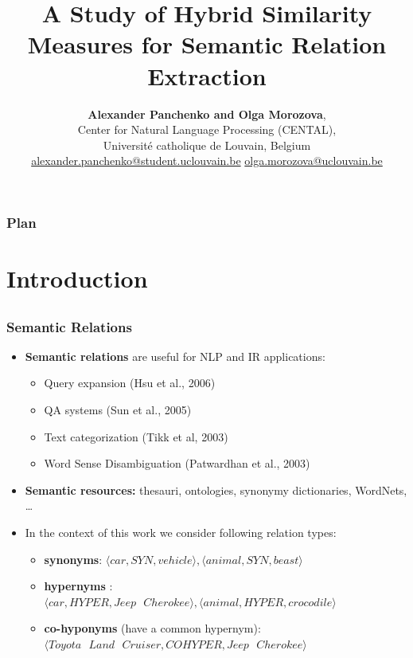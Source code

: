 \documentclass{beamer}
\title[\insertframenumber/\inserttotalframenumber]
{A Study of Hybrid Similarity Measures for Semantic Relation Extraction}
\author[Alexander Panchenko and Olga Morozova]
{\textbf{Alexander Panchenko and Olga Morozova}, \\ Center for Natural Language Processing (CENTAL),\\ Université catholique de Louvain, Belgium \\ {\scriptsize \url{alexander.panchenko@student.uclouvain.be} \url{olga.morozova@uclouvain.be} }}
\begin{document}
\begin{frame}
  \titlepage
\end{frame}

\begin{frame}
  \setcounter{tocdepth}{1}
  \frametitle{Plan}
  \tableofcontents
  \setcounter{tocdepth}{2}
	
\end{frame}

\section{Introduction}
\subsection{}


\begin{frame}
\frametitle{Semantic Relations}


\begin{itemize}
\item \textbf{Semantic relations} are
useful for NLP and IR applications:
\begin{itemize}
  \item Query expansion (Hsu et al., 2006)
  \item QA systems (Sun et al., 2005)	
  \item Text categorization (Tikk et al, 2003)
  \item Word Sense Disambiguation (Patwardhan et al., 2003)
\end{itemize}

\pause

\item \textbf{Semantic resources:} thesauri, ontologies, synonymy dictionaries, WordNets, \ldots

\item In the context of this work we consider following relation types: 
\begin{itemize}
\item \textbf{synonyms}: $\langle car,SYN,vehicle \rangle, \langle animal,SYN,beast \rangle$ 
\item \textbf{hypernyms} : $\langle car,HYPER,Jeep \text{ } Cherokee \rangle, \langle animal,HYPER, crocodile \rangle$
\item \textbf{co-hyponyms} (have a common hypernym):
$\langle Toyota \text{ } Land  \text{ }Cruiser,COHYPER,Jeep \text{ } Cherokee \rangle$
\end{itemize}
\end{itemize}	
\end{frame}
\end{document}
